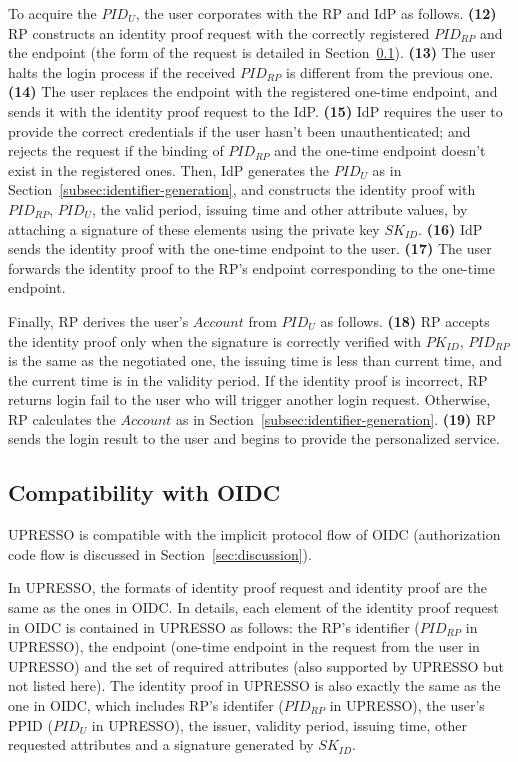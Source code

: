 To acquire the $PID_U$, the user corporates with the RP and IdP as follows. \textbf{(12)} RP constructs an identity proof request with the correctly registered $PID_{RP}$ and the endpoint (the form of the request is detailed in Section~\ref{subsec:compatible}). \textbf{(13)} The user halts the login process if the received $PID_{RP}$ is different from the previous one. \textbf{(14)} The user replaces the endpoint with the registered one-time endpoint, and sends it with the identity proof request to the IdP. \textbf{(15)} IdP requires the user to provide the correct credentials if the user hasn't been unauthenticated; and rejects the request if the binding of $PID_{RP}$ and the one-time endpoint doesn't exist in the registered ones. Then, IdP generates the $PID_U$ as in Section~\ref{subsec:identifier-generation}, and constructs the identity proof with $PID_{RP}$, $PID_U$, the valid period, issuing time and other attribute values, by attaching a signature of these elements using the private key $SK_{ID}$. \textbf{(16)} IdP sends the identity proof with the one-time endpoint to the user. \textbf{(17)} The user forwards the identity proof to the RP's endpoint corresponding to the one-time endpoint.

Finally, RP derives the user's  $Account$ from $PID_U$ as follows. \textbf{(18)} RP accepts the identity proof only when the signature is correctly verified with $PK_{ID}$, $PID_{RP}$ is the same as the negotiated one, the issuing time is less than current time, and the current time is in the validity period. If the identity proof is incorrect, RP returns login fail to the user who will trigger another login request. Otherwise, RP calculates the $Account$ as in Section~\ref{subsec:identifier-generation}. \textbf{(19)} RP sends the login result to the user and begins to provide the personalized service.


\subsection{Compatibility with OIDC}
\label{subsec:compatible}
UPRESSO is compatible with the implicit protocol flow of OIDC (authorization code flow is discussed in Section~\ref{sec:discussion}).

In UPRESSO, the formats of identity proof request and identity proof are the same as the ones in OIDC. In details, each element of the identity proof request in OIDC is contained in UPRESSO as follows: the RP's identifier ($PID_{RP}$ in UPRESSO), the endpoint (one-time endpoint in the request from the user in UPRESSO) and the set of required attributes (also supported by UPRESSO but not listed here). The identity proof in UPRESSO is also exactly the same as the one in OIDC, which includes RP's identifer ($PID_{RP}$ in UPRESSO), the user's PPID ($PID_U$ in UPRESSO), the issuer, validity period, issuing time, other requested attributes and a signature generated by $SK_{ID}$. %


